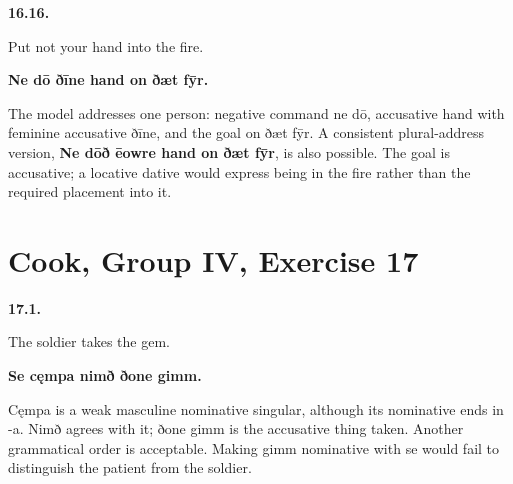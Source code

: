 \par\begin{minipage}{\linewidth}\raggedright
\textbf{16.16.}

Put not your hand into the fire.

\textbf{Ne dō ðīne hand on ðæt fȳr.}

The model addresses one person: negative command ne dō, accusative hand with feminine accusative ðīne, and the goal on ðæt fȳr. A consistent plural-address version, \textbf{Ne dōð ēowre hand on ðæt fȳr}, is also possible. The goal is accusative; a locative dative would express being in the fire rather than the required placement into it.

\end{minipage}\par\addvspace{4pt}

\section*{Cook, Group IV, Exercise 17}

\par\begin{minipage}{\linewidth}\raggedright
\textbf{17.1.}

The soldier takes the gem.

\textbf{Se cęmpa nimð ðone gimm.}

Cęmpa is a weak masculine nominative singular, although its nominative ends in -a. Nimð agrees with it; ðone gimm is the accusative thing taken. Another grammatical order is acceptable. Making gimm nominative with se would fail to distinguish the patient from the soldier.

\end{minipage}\par\addvspace{4pt}

